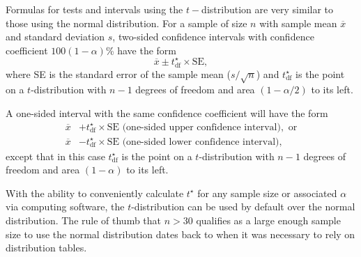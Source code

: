Formulas for tests and intervals using the $t-$distribution are very similar to those using the normal distribution.  For a sample of size $n$ with sample mean $\overline{x}$ and standard deviation $s$, two-sided confidence intervals with confidence coefficient $100(1 - \alpha)$\% have the form
\[
    \overline{x} \pm t_{\text{df}}^{\star} \times \text{SE},
\]
where SE is the standard error of the sample mean ($s/\sqrt{n}$) and $t_{\text{df}}^{\star}$ is the point on a $t$-distribution with $n-1$ degrees of freedom and area $(1 - \alpha/2)$ to its left.

A one-sided interval with the same confidence coefficient will have the form  
\begin{align*}
    \overline{x} &+ t_{\text{df}}^{\star} \times \text{SE} \text{   (one-sided upper confidence interval)}, \text{  or} \\
    \overline{x} &- t_{\text{df}}^{\star} \times \text{SE} \text{   (one-sided lower confidence interval)},
\end{align*}
except that in this case $t_{\text{df}}^{\star}$ is the point on a $t$-distribution with $n-1$ degrees of freedom and  area $(1 - \alpha)$ to its left.

With the ability to conveniently calculate $t^\star$ for any sample size or associated $\alpha$ via computing software, the $t$-distribution can be used by default over the normal distribution. The rule of thumb that $n > 30$ qualifies as a large enough sample size to use the normal distribution dates back to when it was necessary to rely on distribution tables.

